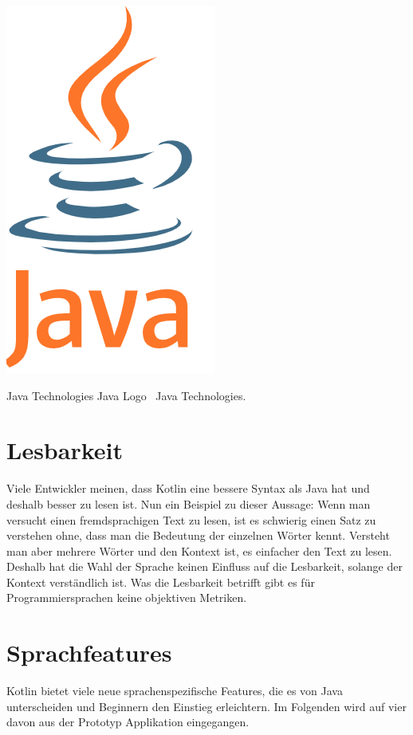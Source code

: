 \documentclass{sigchi-ext}
\begin{document}
\begin{marginfigure}[1pc]
  \begin{minipage}{\marginparwidth}
    \includegraphics[width=0.9\marginparwidth]{figures/javalogo.png}
    \caption{Java Technologies Java Logo
      \cczero~Java Technologies.}
  \end{minipage}
\end{marginfigure}


\section{Lesbarkeit}
Viele Entwickler meinen, dass Kotlin eine bessere Syntax als Java hat und deshalb besser
zu lesen ist. Nun ein Beispiel zu dieser Aussage: Wenn man versucht einen fremdsprachigen
Text zu lesen, ist es schwierig einen Satz zu verstehen ohne, dass man die Bedeutung der
einzelnen Wörter kennt. Versteht man aber mehrere Wörter und den Kontext ist, es einfacher den
Text zu lesen. Deshalb hat die Wahl der Sprache keinen Einfluss auf die Lesbarkeit, solange
der Kontext verständlich ist.
Was die Lesbarkeit betrifft gibt es für Programmiersprachen keine objektiven Metriken.

\section{Sprachfeatures}
Kotlin bietet viele neue sprachenspezifische Features, die es von Java unterscheiden und Beginnern den Einstieg erleichtern. Im Folgenden wird auf vier davon aus der Prototyp Applikation eingegangen.
\end{document}
